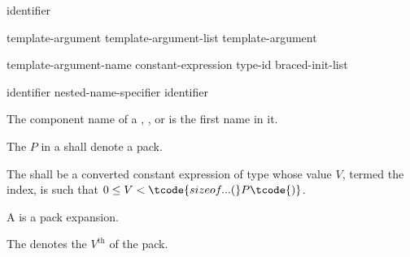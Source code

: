\begin{bnf}
\br
  identifier
\end{bnf}

\begin{bnf}
\br
  template-argument \br
  template-argument-list \terminal{,} template-argument 
\end{bnf}

\begin{bnf}
\br
  template-argument-name\br
  constant-expression\br
  type-id\br
  braced-init-list
\end{bnf}

\begin{bnf}
\br
   identifier\br
  nested-name-specifier  identifier
\end{bnf}

\pnum
{}%
The component name of a
,
, or
is the first name in it.

\pnum
The  $P$
in a 
shall denote a pack.

\pnum
The 
shall be a converted constant expression
of type 
whose value $V$, termed the index, is such that
$0 \le V < \tcode{sizeof...(}P\tcode{)}$.

\pnum
A 
is a pack expansion.

\pnum
\begin{note}
The 
denotes the $V^\text{th}$  of the pack.
\end{note}

